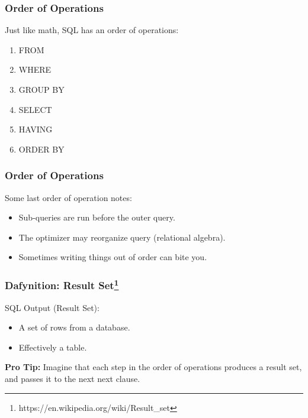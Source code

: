 \documentclass{beamer}
\begin{document}
\begin{frame} %
  \frametitle{Order of Operations}

  Just like math, SQL has an order of operations: 

  \medskip
  \begin{enumerate}
  \item FROM
  \item WHERE
  \item GROUP BY
  \item SELECT
  \item HAVING
  \item ORDER BY
  \end{enumerate}

\end{frame}

\begin{frame} %
  \frametitle{Order of Operations}

  Some last order of operation notes:

  \bigskip
  \begin{itemize}
  \item Sub-queries are run before the outer query.
  \item The optimizer may reorganize query (relational algebra).
  \item Sometimes writing things out of order can bite you.
  \end{itemize}
  
\end{frame}

\begin{frame} %
  \frametitle{Dafynition: Result Set\footnote{https://en.wikipedia.org/wiki/Result\_set}}

  SQL Output (Result Set):

  \begin{itemize}
  \item A set of rows from a database.
  \item Effectively a table.
  \end{itemize}

  \pause
  \begin{center}
  \bigskip \textbf{Pro Tip: } Imagine that each step in the order of
  operations produces a result set, and passes it to the next next
  clause.

  \end{center}


\end{frame}  
\end{document}
